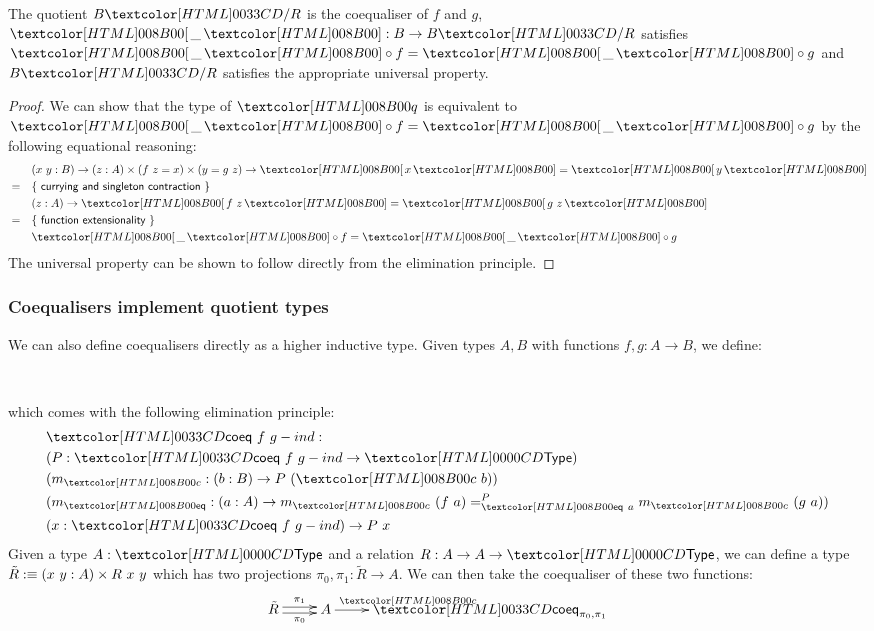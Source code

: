 \begin{proposition}
  The quotient $\quotty{B}{R}$ is the coequaliser of $f$ and $g$, \ie
  $\quotproj{\_} : B \to \quotty{B}{R}$ satisfies
  $\quotproj{\_} \circ f = \quotproj{\_} \circ g$ and $\quotty{B}{R}$
  satisfies the appropriate universal property.
\end{proposition}

\begin{proof}
  We can show that the type of $\quoteq$ is equivalent to
  $\quotproj{\_} \circ f = \quotproj{\_} \circ g$ by the following
  equational reasoning:
  \begin{align*}
    &&&(x\ y : B) \to (z : A) \times (f\ z = x) \times (y = g\ z) \to \quotproj{x} = \quotproj{y} \\
    &=& &\reasontext{currying and singleton contraction} \\
    &&& (z : A) \to \quotproj{f\ z} = \quotproj{g\ z} \\
    &=& &\reasontext{function extensionality} \\
    &&& \quotproj{\_} \circ f = \quotproj{\_} \circ g
  \end{align*}
  The universal property can be shown to follow directly from the
  elimination principle.
\end{proof}
\subsubsection{Coequalisers implement quotient types}

We can also define coequalisers directly as a higher inductive
type. Given types $A, B$ with functions $f, g : A \to B$, we define:
%
\begin{datatype}{}{\Type}
   \\
\end{datatype}
%
which comes with the following elimination principle:
%
\begin{align*}
  &\coeqind{f}{g} : \\
  &(P : \coeqind{f}{g} \to \Type) \\
  &(m_{\coeqproj} : (b : B) \to P\ (\coeqproj\ b)) \\
  &(m_{\coeqeq} : (a : A) \to \pathover{P}{\coeqeq\ a}{m_{\coeqproj}\ (f\ a)}{m_{\coeqproj}\ (g\ a)}) \\
  &(x : \coeqind{f}{g}) \to P\ x
\end{align*}
%
Given a type $A : \Type$ and a relation $R : A \to A \to \Type$, we
can define a type $\tilde{R} :\equiv (x\ y : A) \times R\ x \ y$ which
has two projections $\pi_0, \pi_1 : \tilde{R} \to A$. We can then take
the coequaliser of these two functions:
$$
\xymatrix{
\tilde{R} \ar@<-.5ex>[r]_{\pi_0} \ar@<.5ex>[r]^{\pi_1} &A \ar[r]^{\coeqproj} &\coeqty{\pi_0}{\pi_1}
}
$$

